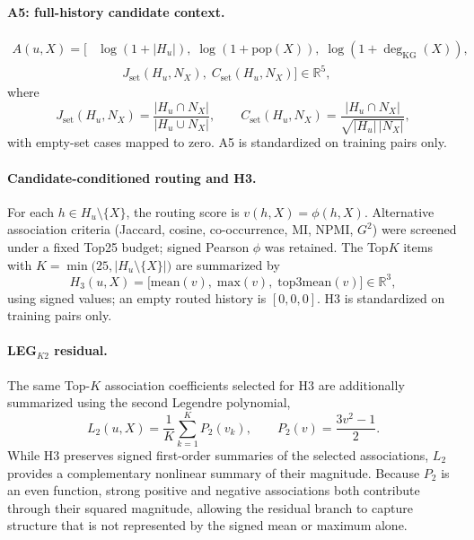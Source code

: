 \paragraph{A5: full-history candidate context.}
\begin{equation}
\label{eq:lastfm-A5}
\begin{aligned}
A(u,X)
=
\bigl[
&\log(1+|H_u|),\;
\log(1+\mathrm{pop}(X)),\;
\log(1+\deg_{\mathrm{KG}}(X)),\\
&\qquad
J_{\mathrm{set}}(H_u,N_X),\;
C_{\mathrm{set}}(H_u,N_X)
\bigr]
\in\mathbb{R}^{5},
\end{aligned}
\end{equation}
where
\begin{equation}
\label{eq:lastfm-Jset}
J_{\mathrm{set}}(H_u,N_X)=\frac{|H_u\cap N_X|}{|H_u\cup N_X|},
\qquad
C_{\mathrm{set}}(H_u,N_X)=\frac{|H_u\cap N_X|}{\sqrt{|H_u|\,|N_X|}},
\end{equation}
with empty-set cases mapped to zero.
A5 is standardized on training pairs only.

\paragraph{Candidate-conditioned routing and H3.}
For each $h\in H_u\setminus\{X\}$, the routing score is $v(h,X)=\phi(h,X)$.
Alternative association criteria (Jaccard, cosine, co-occurrence, MI, NPMI, $G^{2}$) were screened under a fixed Top25 budget; signed Pearson $\phi$ was retained.
The Top$K$ items with $K=\min\bigl(25,|H_u\setminus\{X\}|\bigr)$ are summarized by
\begin{equation}
\label{eq:lastfm-H3}
H_3(u,X)=\bigl[\mathrm{mean}(v),\;\mathrm{max}(v),\;\mathrm{top3mean}(v)\bigr]\in\mathbb{R}^{3},
\end{equation}
using signed values; an empty routed history is $[0,0,0]$.
H3 is standardized on training pairs only.

\paragraph{LEG$_{K2}$ residual.}
The same Top-$K$ association coefficients selected for H3 are additionally summarized using the second Legendre polynomial,
\begin{equation}
\label{eq:lastfm-L2}
L_2(u,X)=\frac{1}{K}\sum_{k=1}^{K}P_2(v_k),
\qquad
P_2(v)=\frac{3v^{2}-1}{2}.
\end{equation}
While H3 preserves signed first-order summaries of the selected associations, $L_2$ provides a complementary nonlinear summary of their magnitude.
Because $P_2$ is an even function, strong positive and negative associations both contribute through their squared magnitude, allowing the residual branch to capture structure that is not represented by the signed mean or maximum alone.

